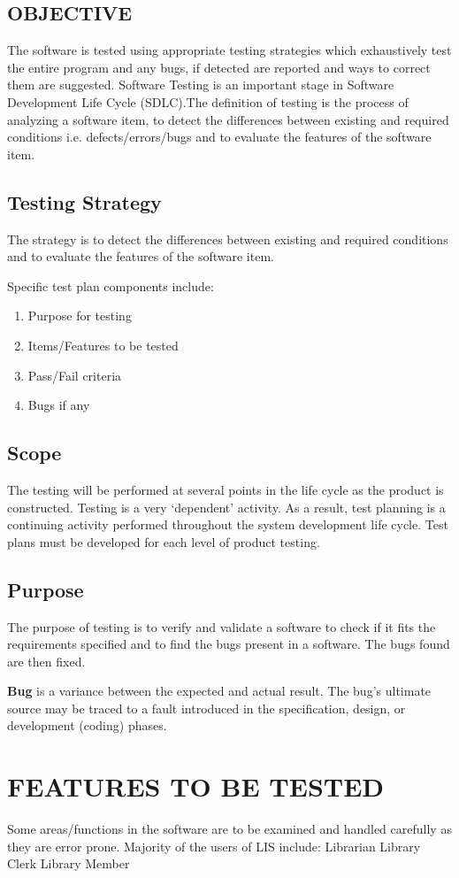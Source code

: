 \documentclass{article}
\begin{document}
\subsection{OBJECTIVE}
The software is tested using appropriate testing strategies which exhaustively test the entire program and any bugs, if detected are reported and ways to correct them are suggested.
Software Testing is an important stage in Software Development Life Cycle (SDLC).The definition of testing is the process of analyzing a software item, to detect the differences between existing and required conditions i.e. defects/errors/bugs and to evaluate the features of the software item. 
\subsection{Testing Strategy}
The strategy is to detect the differences between existing and required conditions and to evaluate the features of the software item. 

Specific test plan components include: 
\begin{enumerate}
\item Purpose for testing 
\item Items/Features to be tested
\item Pass/Fail criteria
\item Bugs if any
\end{enumerate}
 
\subsection{Scope}
The testing will be performed at several points in the life cycle as the product is constructed. Testing is a very ‘dependent’ activity. As a result, test planning is a continuing activity performed throughout the system development life cycle. Test plans must be developed for each level of product testing.
\subsection{Purpose}
The purpose of testing is to verify and validate a software to check if it fits the requirements specified and to find the bugs present in a software. The bugs found are then fixed.
 
\textbf{Bug} is a variance between the expected and actual result. The bug’s ultimate source may be traced to a fault introduced in the specification, design, or development (coding) phases. 
\section{FEATURES TO BE TESTED}
Some areas/functions in the software are to be examined and handled carefully as they are error prone. 
Majority of the users of LIS include:
Librarian
Library Clerk
Library Member
\end{document}
